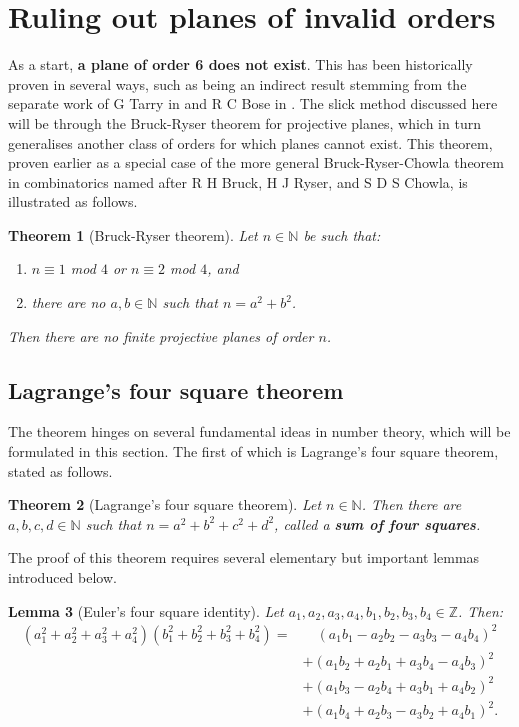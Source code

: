 \documentclass{report}
\newcommand{\N}{\mathbb{N}}
\newcommand{\Z}{\mathbb{Z}}
\newtheorem{theorem}{Theorem}[section]
\newtheorem{lemma}[theorem]{Lemma}
\theoremstyle{definition}\newtheorem*{definition}{Definition}
\theoremstyle{definition}\newtheorem*{example}{Example}
\theoremstyle{remark}\newtheorem*{remark}{Remark}
\begin{document}
\section{Ruling out planes of invalid orders}

As a start, \textbf{a plane of order 6 does not exist}. This has been historically proven in several ways, such as being an indirect result stemming from the separate work of G Tarry in \cite{tarry} and R C Bose in \cite{bose}. The slick method discussed here will be through the Bruck-Ryser theorem for projective planes, which in turn generalises another class of orders for which planes cannot exist. This theorem, proven earlier as a special case of the more general Bruck-Ryser-Chowla theorem in combinatorics named after R H Bruck, H J Ryser, and S D S Chowla, is illustrated as follows.

\begin{theorem}[Bruck-Ryser theorem]
\label{thm:bruckryser}
Let $ n \in \N $ be such that:
\begin{enumerate}
  \item $ n \equiv 1 $ mod $ 4 $ or $ n \equiv 2 $ mod $ 4 $, and
  \item there are no $ a, b \in \N $ such that $ n = a^2 + b^2 $.
\end{enumerate}
Then there are no finite projective planes of order $ n $.
\end{theorem}

\subsection{Lagrange's four square theorem}

The theorem hinges on several fundamental ideas in number theory, which will be formulated in this section. The first of which is Lagrange's four square theorem, stated as follows.

\begin{theorem}[Lagrange's four square theorem]
\label{thm:lagrangefoursquare}
Let $ n \in \N $. Then there are $ a, b, c, d \in \N $ such that $ n = a^2 + b^2 + c^2 + d^2 $, called a \textbf{sum of four squares}.
\end{theorem}

The proof of this theorem requires several elementary but important lemmas introduced below.

\begin{lemma}[Euler's four square identity]
\label{lemma:eulerfoursquare}
Let $ a_1, a_2, a_3, a_4, b_1, b_2, b_3, b_4 \in \Z $. Then:
\begin{align*}
(a_1^2 + a_2^2 + a_3^2 + a_4^2) (b_1^2 + b_2^2 + b_3^2 + b_4^2)
= & \quad (a_1 b_1 - a_2 b_2 - a_3 b_3 - a_4 b_4)^2 \\
& + (a_1 b_2 + a_2 b_1 + a_3 b_4 - a_4 b_3)^2 \\
& + (a_1 b_3 - a_2 b_4 + a_3 b_1 + a_4 b_2)^2 \\
& + (a_1 b_4 + a_2 b_3 - a_3 b_2 + a_4 b_1)^2.
\end{align*}
\end{lemma}
\end{document}
